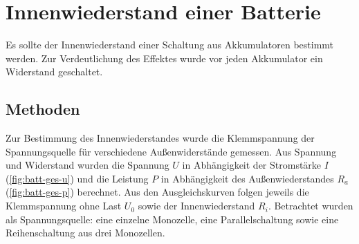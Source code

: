



\section{Innenwiederstand einer Batterie}

Es sollte der Innenwiederstand einer Schaltung aus Akkumulatoren bestimmt werden. Zur Verdeutlichung des Effektes wurde vor jeden Akkumulator ein Widerstand geschaltet. 

\subsection{Methoden}


Zur Bestimmung des Innenwiederstandes wurde die Klemmspannung der Spannungsquelle für verschiedene Außenwiderstände gemessen. Aus Spannung und Widerstand wurden die Spannung $U$ in Abhängigkeit der Stromstärke $I$ (\cref{fig:batt-ges-u}) und die Leistung $P$ in Abhängigkeit des Außenwiederstandes $R_a$ (\cref{fig:batt-ges-p}) berechnet. Aus den Ausgleichskurven folgen jeweils die Klemmspannung ohne Last $U_0$ sowie der Innenwiederstand $R_i$. Betrachtet wurden als Spannungsquelle: eine einzelne Monozelle, eine Parallelschaltung sowie eine Reihenschaltung aus drei Monozellen. 







